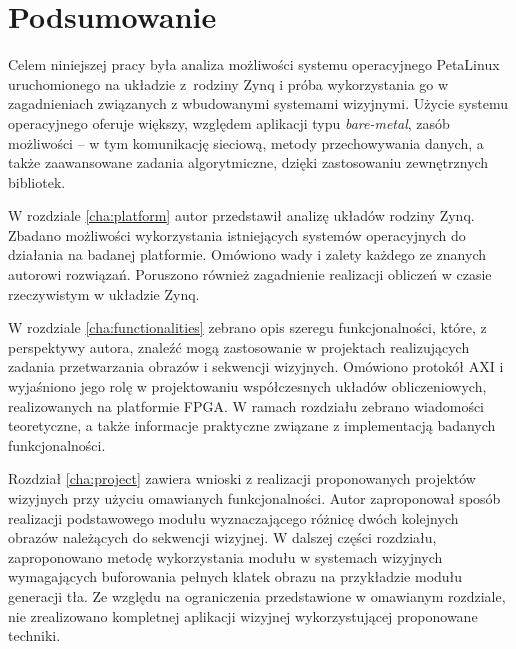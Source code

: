 \chapter{Podsumowanie}
\label{chap:summary}

 
Celem niniejszej pracy była analiza możliwości systemu operacyjnego PetaLinux uruchomionego na układzie z~rodziny Zynq i próba wykorzystania go w zagadnieniach związanych z wbudowanymi systemami wizyjnymi. 
Użycie systemu operacyjnego oferuje większy, względem aplikacji typu \textit{bare-metal}, zasób możliwości -- w tym komunikację sieciową, metody przechowywania danych, a także zaawansowane zadania algorytmiczne, dzięki zastosowaniu zewnętrznych bibliotek. %

W rozdziale \ref{cha:platform} autor przedstawił analizę układów rodziny Zynq. Zbadano możliwości wykorzystania istniejących systemów operacyjnych do działania na badanej platformie. Omówiono wady i zalety każdego ze znanych autorowi rozwiązań. Poruszono również zagadnienie realizacji obliczeń w czasie rzeczywistym w układzie Zynq.

W rozdziale \ref{cha:functionalities} zebrano opis szeregu funkcjonalności, które, z perspektywy autora, znaleźć mogą zastosowanie w projektach realizujących zadania przetwarzania obrazów i sekwencji wizyjnych. %
Omówiono protokół AXI i wyjaśniono jego rolę w projektowaniu współczesnych układów obliczeniowych, realizowanych na platformie FPGA. %
W ramach rozdziału zebrano wiadomości teoretyczne, a także informacje praktyczne związane z implementacją badanych funkcjonalności.

Rozdział \ref{cha:project} zawiera wnioski z realizacji proponowanych projektów wizyjnych przy użyciu omawianych funkcjonalności. 
Autor zaproponował sposób realizacji podstawowego modułu wyznaczającego różnicę dwóch kolejnych obrazów należących do sekwencji wizyjnej. 
W dalszej części rozdziału, zaproponowano  metodę wykorzystania modułu w systemach wizyjnych wymagających buforowania pełnych klatek obrazu na przykładzie modułu generacji tła. 
Ze względu na ograniczenia przedstawione w omawianym rozdziale, nie zrealizowano kompletnej aplikacji wizyjnej wykorzystującej proponowane techniki.

